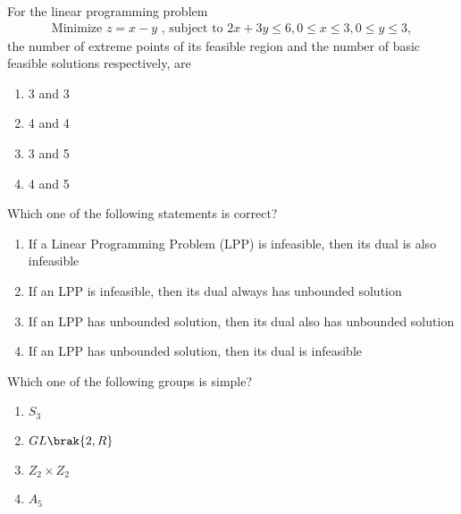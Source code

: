 \iffalse
\title{Assignment3}
\author{ee24btech11064}
\chapter{2010}
\section{ma}
\fi

\item For the linear programming problem
\begin{align*}
    \text{Minimize } z = x - y \text{ , subject to } 2x + 3y \leq 6, 0 \leq x \leq 3, 0 \leq y \leq 3,
\end{align*}
the number of extreme points of its feasible region and the number of basic feasible solutions respectively, are
\begin{multicols}{2}
    \begin{enumerate}
        \item 3 and 3
        \item 4 and 4 
        \item 3 and 5
        \item 4 and 5
    \end{enumerate}
\end{multicols}
\item Which one of the following statements is correct?
\begin{enumerate}
        \item If a Linear Programming Problem (LPP) is infeasible, then its dual is also infeasible
        \item If an LPP is infeasible, then its dual always has unbounded solution
        \item If an LPP has unbounded solution, then its dual also has unbounded solution
        \item If an LPP has unbounded solution, then its dual is infeasible
\end{enumerate}
\item Which one of the following groups is simple?
\begin{multicols}{2}
\begin{enumerate}
        \item $S_3$
        \item $GL\brak{2,R}$
        \item $Z_2 \times Z_2$
        \item $A_5$
\end{enumerate}
\end{multicols}
